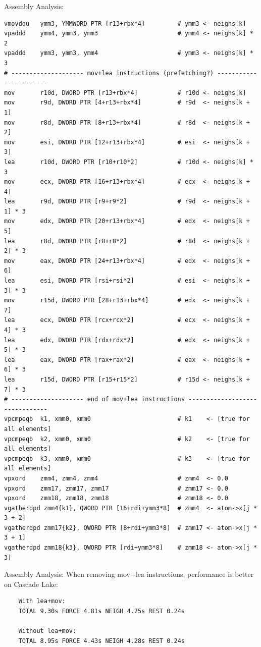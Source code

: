 \documentclass[aspectratio=43,t]{beamer}
\begin{document}
  \begin{frame}[fragile]{Assembly Analysis:}
    \begin{lstlisting}[basicstyle=\tt\tiny]
vmovdqu   ymm3, YMMWORD PTR [r13+rbx*4]         # ymm3 <- neighs[k]
vpaddd    ymm4, ymm3, ymm3                      # ymm4 <- neighs[k] * 2
vpaddd    ymm3, ymm3, ymm4                      # ymm3 <- neighs[k] * 3
# -------------------- mov+lea instructions (prefetching?) -----------------------
mov       r10d, DWORD PTR [r13+rbx*4]           # r10d <- neighs[k]
mov       r9d, DWORD PTR [4+r13+rbx*4]          # r9d  <- neighs[k + 1]
mov       r8d, DWORD PTR [8+r13+rbx*4]          # r8d  <- neighs[k + 2]
mov       esi, DWORD PTR [12+r13+rbx*4]         # esi  <- neighs[k + 3]
lea       r10d, DWORD PTR [r10+r10*2]           # r10d <- neighs[k] * 3
mov       ecx, DWORD PTR [16+r13+rbx*4]         # ecx  <- neighs[k + 4]
lea       r9d, DWORD PTR [r9+r9*2]              # r9d  <- neighs[k + 1] * 3
mov       edx, DWORD PTR [20+r13+rbx*4]         # edx  <- neighs[k + 5]
lea       r8d, DWORD PTR [r8+r8*2]              # r8d  <- neighs[k + 2] * 3
mov       eax, DWORD PTR [24+r13+rbx*4]         # edx  <- neighs[k + 6]
lea       esi, DWORD PTR [rsi+rsi*2]            # esi  <- neighs[k + 3] * 3
mov       r15d, DWORD PTR [28+r13+rbx*4]        # edx  <- neighs[k + 7]
lea       ecx, DWORD PTR [rcx+rcx*2]            # ecx  <- neighs[k + 4] * 3
lea       edx, DWORD PTR [rdx+rdx*2]            # edx  <- neighs[k + 5] * 3
lea       eax, DWORD PTR [rax+rax*2]            # eax  <- neighs[k + 6] * 3
lea       r15d, DWORD PTR [r15+r15*2]           # r15d <- neighs[k + 7] * 3
# -------------------- end of mov+lea instructions -------------------------------
vpcmpeqb  k1, xmm0, xmm0                        # k1    <- [true for all elements]
vpcmpeqb  k2, xmm0, xmm0                        # k2    <- [true for all elements]
vpcmpeqb  k3, xmm0, xmm0                        # k3    <- [true for all elements]
vpxord    zmm4, zmm4, zmm4                      # zmm4  <- 0.0
vpxord    zmm17, zmm17, zmm17                   # zmm17 <- 0.0
vpxord    zmm18, zmm18, zmm18                   # zmm18 <- 0.0
vgatherdpd zmm4{k1}, QWORD PTR [16+rdi+ymm3*8]  # zmm4  <- atom->x[j * 3 + 2]
vgatherdpd zmm17{k2}, QWORD PTR [8+rdi+ymm3*8]  # zmm17 <- atom->x[j * 3 + 1]
vgatherdpd zmm18{k3}, QWORD PTR [rdi+ymm3*8]    # zmm18 <- atom->x[j * 3]
    \end{lstlisting}
  \end{frame}

  \begin{frame}[fragile]{Assembly Analysis:}
    When removing mov+lea instructions, performance is better on Cascade Lake:
    \begin{verbatim}
    With lea+mov:
    TOTAL 9.30s FORCE 4.81s NEIGH 4.25s REST 0.24s

    Without lea+mov:
    TOTAL 8.95s FORCE 4.43s NEIGH 4.28s REST 0.24s
    \end{verbatim}
  \end{frame}
\end{document}
